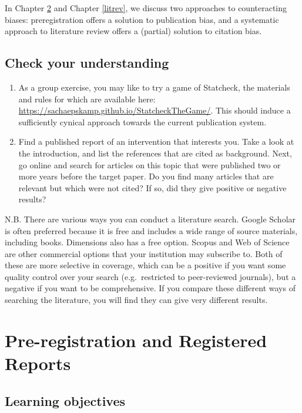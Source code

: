 \documentclass{krantz}
\begin{document}
In Chapter \ref{prereg} and Chapter \ref{litrev}, we discuss two approaches to counteracting biases: preregistration offers a solution to publication bias, and a systematic approach to literature review offers a (partial) solution to citation bias.

\hypertarget{check-your-understanding-20}{%
\section{Check your understanding}\label{check-your-understanding-20}}

\begin{enumerate}
\def\labelenumi{\arabic{enumi}.}
\item
  As a group exercise, you may like to try a game of Statcheck, the materials and rules for which are available here: \url{https://sachaepskamp.github.io/StatcheckTheGame/}. This should induce a sufficiently cynical approach towards the current publication system.
\item
  Find a published report of an intervention that interests you. Take a look at the introduction, and list the references that are cited as background. Next, go online and search for articles on this topic that were published two or more years before the target paper. Do you find many articles that are relevant but which were not cited? If so, did they give positive or negative results?
\end{enumerate}

N.B. There are various ways you can conduct a literature search. Google Scholar is often preferred because it is free and includes a wide range of source materials, including books. Dimensions also has a free option. Scopus and Web of Science are other commercial options that your institution may subscribe to. Both of these are more selective in coverage, which can be a positive if you want some quality control over your search (e.g.~restricted to peer-reviewed journals), but a negative if you want to be comprehensive. If you compare these different ways of searching the literature, you will find they can give very different results.

\hypertarget{prereg}{%
\chapter{Pre-registration and Registered Reports}\label{prereg}}

\hypertarget{learning-objectives-20}{%
\section{Learning objectives}\label{learning-objectives-20}}
\end{document}
